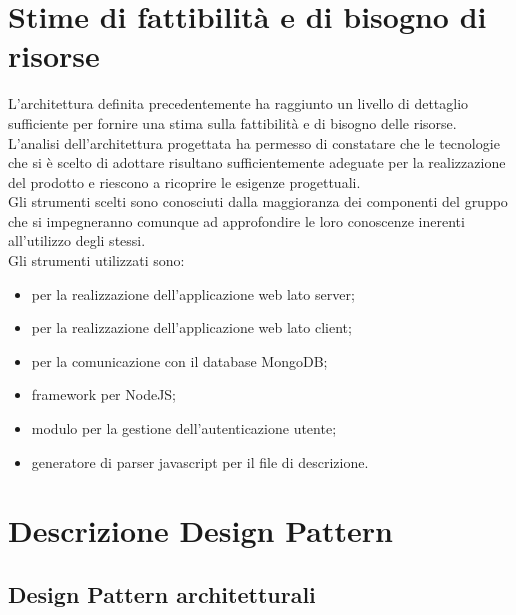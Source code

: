 \newpage
\section{Stime di fattibilità e di bisogno di risorse}
L'architettura definita precedentemente ha raggiunto un livello di dettaglio sufficiente per fornire una stima sulla fattibilità e di bisogno delle risorse.\\
L'analisi dell'architettura progettata ha permesso di constatare che le tecnologie che si è scelto di adottare risultano sufficientemente adeguate per la realizzazione del prodotto e riescono a ricoprire le esigenze progettuali.\\
Gli strumenti scelti sono conosciuti dalla maggioranza dei componenti del gruppo che si impegneranno comunque ad approfondire le loro conoscenze inerenti all'utilizzo degli stessi.\\
Gli strumenti utilizzati sono:
\begin{itemize}
\item {} per la realizzazione dell'applicazione web lato server;
\item {} per la realizzazione dell'applicazione web lato client;
\item {} per la comunicazione con il database MongoDB;
\item {} framework per NodeJS;
\item {} modulo per la gestione dell'autenticazione utente;
\item {} generatore di parser javascript per il file di descrizione.
\end{itemize}


\newpage
\appendix
\section{Descrizione Design Pattern} %

\subsection{Design Pattern architetturali}
